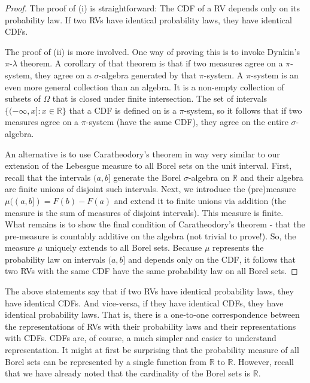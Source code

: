 \documentclass{book}
\theoremstyle{plain}%
\theoremstyle{definition}
\begin{document}
\begin{proof}
The proof of (i) is straightforward: The CDF of a RV depends only on its probability law. If two RVs have identical probability laws, they have identical CDFs.

The proof of (ii) is more involved. One way of proving this is to invoke Dynkin's $\pi$-$\lambda$ theorem. A corollary of that theorem is that if two measures agree on a $\pi$-system, they agree on a $\sigma$-algebra generated by that $\pi$-system. A $\pi$-system is an even more general collection than an algebra. It is a non-empty collection of subsets of $\Omega$ that is closed under finite intersection. The set of intervals $\{(-\infty, x]: x\in \mathbb{R} \}$ that a CDF is defined on is a $\pi$-system, so it follows that if two measures agree on a $\pi$-system (have the same CDF), they agree on the entire $\sigma$-algebra.

An alternative is to use Caratheodory's theorem in way very similar to our extension of the Lebesgue measure to all Borel sets on the unit interval. First, recall that the intervals $(a, b]$ generate the Borel $\sigma$-algebra on $\mathbb{R}$ and their algebra are finite unions of disjoint such intervals. Next, we introduce the (pre)measure $\mu((a,b]) = F(b) - F(a)$ and extend it to finite unions via addition (the measure is the sum of measures of disjoint intervals). This measure is finite. What remains is to show the final condition of Caratheodory's theorem - that the pre-measure is countably additive on the algebra (not trivial to prove!). So, the measure $\mu$ uniquely extends to all Borel sets. Because $\mu$ represents the probability law on intervals $(a, b]$ and depends only on the CDF, it follows that two RVs with the same CDF have the same probability law on all Borel sets.
\end{proof}

The above statements say that if two RVs have identical probability laws, they have identical CDFs. And vice-versa, if they have identical CDFs, they have identical probability laws. That is, there is a one-to-one correspondence between the representations of RVs with their probability laws and their representations with CDFs. CDFs are, of course, a much simpler and easier to understand representation. It might at first be surprising that the probability measure of all Borel sets can be represented by a single function from $\mathbb{R}$ to $\mathbb{R}$. However, recall that we have already noted that the cardinality of the Borel sets is $\mathbb{R}$.
\end{document}
